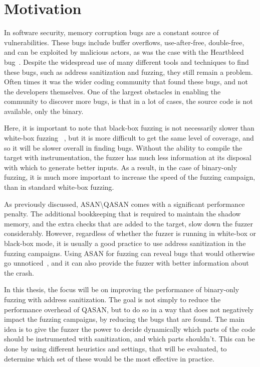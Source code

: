 \section{Motivation}
In software security, memory corruption bugs are a constant source of vulnerabilities. These bugs include buffer overflows,
use-after-free, double-free, and can be exploited by malicious actors, as was the case with the Heartbleed 
bug~\parencite{10.1145/2663716.2663755}. Despite the widespread use of many different tools and techniques to find these bugs,
such as address sanitization and fuzzing, they still remain a problem. Often times it was the wider coding community that
found these bugs, and not the developers themselves. One of the largest obstacles in enabling the community to discover
more bugs, is that in a lot of cases, the source code is not available, only the binary. 

Here, it is important to note that black-box fuzzing is not necessarily slower than white-box fuzzing
~\parencite{electronics12143010}, but it is more difficult to get the same level of coverage, and so it will be slower overall
in finding bugs. Without the ability to compile the target with instrumentation, the fuzzer has much less information at its
disposal with which to generate better inputs. As a result, in the case of binary-only fuzzing, it is much more important to 
increase the speed of the fuzzing campaign, than in standard white-box fuzzing.

As previously discussed, \ac{ASAN}\textbackslash\ac{QASAN} comes with a significant performance penalty. The additional 
bookkeeping that is required to maintain the shadow memory, and the extra checks that are added to the target, slow down 
the fuzzer considerably. However, regardless of whether the fuzzer is running in white-box or black-box mode, it is
usually a good practice to use address sanitization in the fuzzing campaigns. Using \ac{ASAN} for fuzzing can reveal
bugs that would otherwise go unnoticed~\parencite{malmain:hal-04500872}, and it can also provide the fuzzer with better
information about the crash.

In this thesis, the focus will be on improving the performance of binary-only fuzzing with address sanitization. The goal is not
simply to reduce the performance overhead of \ac{QASAN}, but to do so in a way that does not negatively impact the fuzzing
campaigns, by reducing the bugs that are found. The main idea is to give the fuzzer the power to decide dynamically which
parts of the code should be instrumented with sanitization, and which parts shouldn't. This can be done by using different
heuristics and settings, that will be evaluated, to determine which set of these would be the most effective in practice.